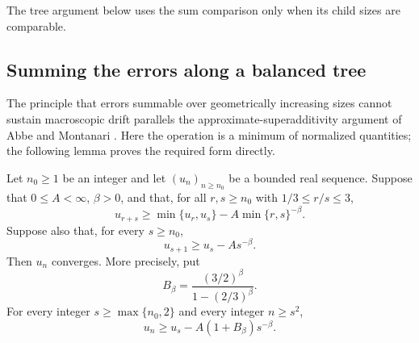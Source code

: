 The tree argument below uses the sum comparison only when its child
sizes are comparable.

\subsection{Summing the errors along a balanced tree}

The principle that errors summable over geometrically increasing sizes
cannot sustain macroscopic drift parallels the approximate-superadditivity
argument of Abbe and Montanari \cite[arXiv version, Lemma~8]{AM}.
Here the operation is a minimum of normalized quantities; the following
lemma proves the required form directly.

\begin{samepage}
\begin{lemma}\label{lem:balanced-comparison}
Let \(n_0\ge1\) be an integer and let \((u_n)_{n\ge n_0}\) be a bounded
real sequence.  Suppose that \(0\le A<\infty\), \(\beta>0\), and that,
for all \(r,s\ge n_0\) with \(1/3\le r/s\le3\),
\[
 u_{r+s}\ge\min\{u_r,u_s\}-A\min\{r,s\}^{-\beta}.
\]
Suppose also that, for every \(s\ge n_0\),
\[
 u_{s+1}\ge u_s-As^{-\beta}.
\]
Then \(u_n\) converges.  More precisely, put
\[
 B_\beta=\frac{(3/2)^\beta}{1-(2/3)^\beta}.
\]
For every integer \(s\ge\max\{n_0,2\}\) and every integer \(n\ge s^2\),
\begin{equation}\label{eq:balanced-comparison-bound}
 u_n\ge u_s-A(1+B_\beta)s^{-\beta}.
\end{equation}
\end{lemma}
\end{samepage}

